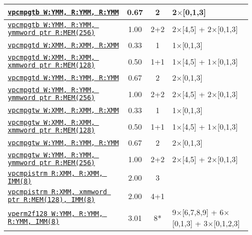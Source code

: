 \documentclass[a4paper,english,fontsize=9]{scrartcl}
\begin{document}
\begin{longtable}{p{}ccL{.25\textwidth}}
  \midrule
  \texttt{\href{https://felixcloutier.com/x86/PCMPGTB:PCMPGTW:PCMPGTD.html}{vpcmpgtb W:YMM, R:YMM, R:YMM}} & 0.67 & 2 & 2\(\times\)[0,1,3] \\
  \midrule
  \texttt{\href{https://felixcloutier.com/x86/PCMPGTB:PCMPGTW:PCMPGTD.html}{vpcmpgtb W:YMM, R:YMM, ymmword ptr R:MEM(256)}} & 1.00 & 2+2 & 2\(\times\)[4,5] + 2\(\times\)[0,1,3] \\
  \midrule
  \texttt{\href{https://felixcloutier.com/x86/PCMPGTB:PCMPGTW:PCMPGTD.html}{vpcmpgtd W:XMM, R:XMM, R:XMM}} & 0.33 & 1 & 1\(\times\)[0,1,3] \\
  \midrule
  \texttt{\href{https://felixcloutier.com/x86/PCMPGTB:PCMPGTW:PCMPGTD.html}{vpcmpgtd W:XMM, R:XMM, xmmword ptr R:MEM(128)}} & 0.50 & 1+1 & 1\(\times\)[4,5] + 1\(\times\)[0,1,3] \\
  \midrule
  \texttt{\href{https://felixcloutier.com/x86/PCMPGTB:PCMPGTW:PCMPGTD.html}{vpcmpgtd W:YMM, R:YMM, R:YMM}} & 0.67 & 2 & 2\(\times\)[0,1,3] \\
  \midrule
  \texttt{\href{https://felixcloutier.com/x86/PCMPGTB:PCMPGTW:PCMPGTD.html}{vpcmpgtd W:YMM, R:YMM, ymmword ptr R:MEM(256)}} & 1.00 & 2+2 & 2\(\times\)[4,5] + 2\(\times\)[0,1,3] \\
  \midrule
  \texttt{\href{https://felixcloutier.com/x86/PCMPGTB:PCMPGTW:PCMPGTD.html}{vpcmpgtw W:XMM, R:XMM, R:XMM}} & 0.33 & 1 & 1\(\times\)[0,1,3] \\
  \midrule
  \texttt{\href{https://felixcloutier.com/x86/PCMPGTB:PCMPGTW:PCMPGTD.html}{vpcmpgtw W:XMM, R:XMM, xmmword ptr R:MEM(128)}} & 0.50 & 1+1 & 1\(\times\)[4,5] + 1\(\times\)[0,1,3] \\
  \midrule
  \texttt{\href{https://felixcloutier.com/x86/PCMPGTB:PCMPGTW:PCMPGTD.html}{vpcmpgtw W:YMM, R:YMM, R:YMM}} & 0.67 & 2 & 2\(\times\)[0,1,3] \\
  \midrule
  \texttt{\href{https://felixcloutier.com/x86/PCMPGTB:PCMPGTW:PCMPGTD.html}{vpcmpgtw W:YMM, R:YMM, ymmword ptr R:MEM(256)}} & 1.00 & 2+2 & 2\(\times\)[4,5] + 2\(\times\)[0,1,3] \\
  \midrule
  \texttt{\href{https://felixcloutier.com/x86/PCMPISTRM.html}{vpcmpistrm R:XMM, R:XMM, IMM(8)}} & 2.00 & 3 &  \\
  \midrule
  \texttt{\href{https://felixcloutier.com/x86/PCMPISTRM.html}{vpcmpistrm R:XMM, xmmword ptr R:MEM(128), IMM(8)}} & 2.00 & 4+1 &  \\
  \midrule
  \texttt{\href{https://felixcloutier.com/x86/VPERM2F128.html}{vperm2f128 W:YMM, R:YMM, R:YMM, IMM(8)}} & 3.01 & 8* & 9\(\times\)[6,7,8,9] + 6\(\times\)[0,1,3] + 3\(\times\)[0,1,2,3] \\

\end{longtable}
\end{document}
